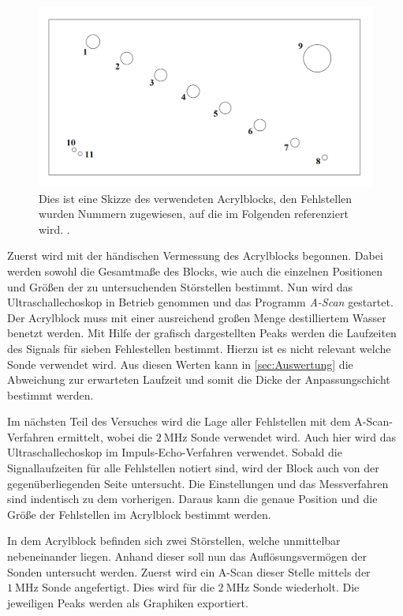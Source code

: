 \begin{figure}
    \centering
	\includegraphics[width=\textwidth]{content/Acrylblock.png}
    \caption{Dies ist eine Skizze des verwendeten Acrylblocks, den Fehlstellen wurden Nummern zugewiesen, auf die im Folgenden referenziert wird. \cite{vUS2}.}
    \label{fig:acrylskizze}
\end{figure}

Zuerst wird mit der händischen Vermessung des Acrylblocks begonnen. Dabei werden sowohl die Gesamtmaße des Blocks, wie auch die einzelnen Positionen und Größen der zu 
untersuchenden Störstellen bestimmt. Nun wird das Ultraschallechoskop in Betrieb genommen und das Programm \textit{A-Scan} gestartet. Der Acrylblock muss mit 
einer ausreichend großen Menge destilliertem Wasser benetzt werden. Mit Hilfe der grafisch dargestellten Peaks werden die Laufzeiten des Signals für sieben Fehlestellen
bestimmt. Hierzu ist es nicht relevant welche Sonde verwendet wird.
Aus diesen Werten kann in \autoref{sec:Auswertung} die Abweichung zur erwarteten Laufzeit und somit die Dicke der Anpassungschicht bestimmt werden. 
 
Im nächsten Teil des Versuches wird die Lage aller Fehlstellen mit dem A-Scan-Verfahren ermittelt,
wobei die $\qty{2}{\mega\hertz}$ Sonde verwendet wird. Auch hier wird das Ultraschallechoskop 
im Impuls-Echo-Verfahren verwendet. Sobald die Signallaufzeiten für alle Fehlstellen notiert sind, wird der Block auch von der gegenüberliegenden Seite untersucht. 
Die Einstellungen und das Messverfahren sind indentisch zu dem vorherigen. Daraus kann die genaue
Position und die Größe der Fehlstellen im Acrylblock bestimmt werden.

In dem Acrylblock befinden sich zwei Störstellen, welche unmittelbar nebeneinander liegen. Anhand dieser soll nun das Auflösungsvermögen der Sonden untersucht werden. Zuerst wird 
ein A-Scan dieser Stelle mittels der $\qty{1}{\mega\hertz}$ Sonde angefertigt. Dies wird für die $\qty{2}{\mega\hertz}$ Sonde wiederholt. Die jeweiligen Peaks werden als Graphiken
exportiert.

